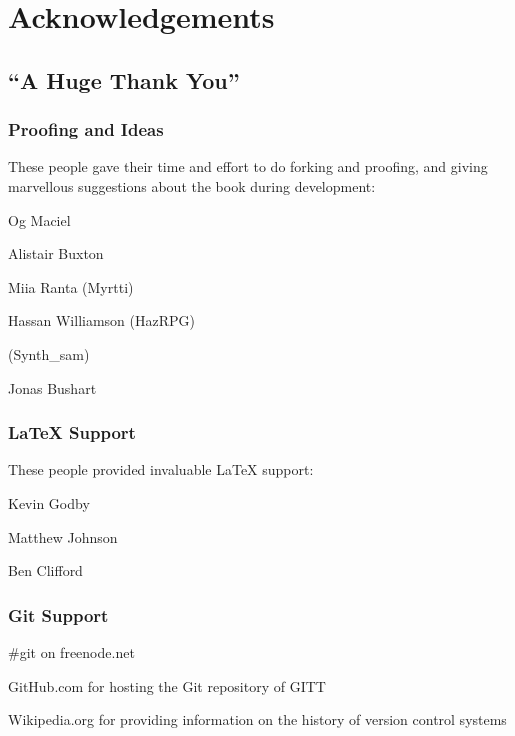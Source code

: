 \chapter{Acknowledgements}
\section{``A Huge Thank You''}

\subsection{Proofing and Ideas}
These people gave their time and effort to do forking and proofing, and giving marvellous suggestions about the book during development:

Og Maciel

Alistair Buxton

Miia Ranta (Myrtti)

Hassan Williamson (HazRPG)

(Synth\_sam)

Jonas Bushart

\subsection{\LaTeX{} Support}
These people provided invaluable \LaTeX{} support:

Kevin Godby

Matthew Johnson

Ben Clifford

\subsection{Git Support}
\#git on freenode.net

GitHub.com for hosting the Git repository of GITT

Wikipedia.org for providing information on the history of version control systems

